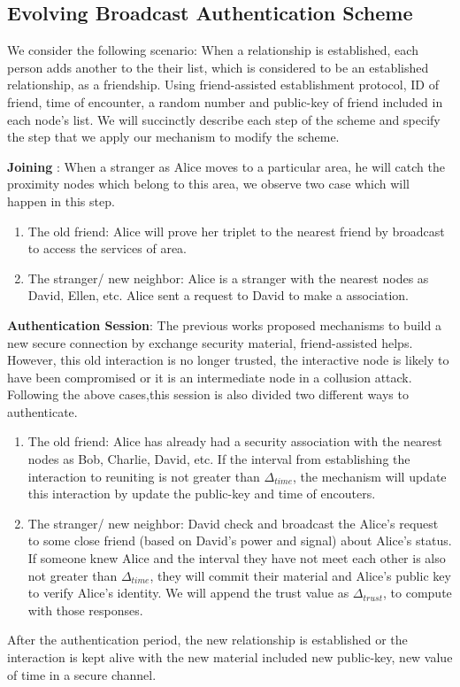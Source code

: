 \documentclass[sigconf]{acmart}
\begin{document}
\subsection{Evolving Broadcast Authentication Scheme}
We consider the following scenario: When a relationship is established, each person adds another to the their list, which is considered to be an established relationship, as a friendship. Using friend-assisted establishment protocol, ID of friend, time of encounter, a random number and public-key of friend included in each node's list. We will succinctly describe each step of the scheme and specify the step that we apply our mechanism to modify the scheme.\par
\textbf{Joining	}: When a stranger as Alice moves to a particular area, he will catch the proximity nodes which belong to this area, we observe two case which will happen in this step. 
    \begin{enumerate}
		\item The old friend: Alice will prove her triplet to the nearest friend by broadcast to access the services of area.
		\item The stranger/ new neighbor: Alice is a stranger with the nearest nodes as David, Ellen, etc. Alice sent a request to David to make a association.
	\end{enumerate} \par
\textbf{Authentication Session}: The previous works proposed mechanisms to build a new secure connection by exchange security material, friend-assisted helps. However, this old interaction is no longer trusted, the interactive node is likely to have been compromised or it is an intermediate node in a collusion attack. Following the above cases,this session is also divided two different ways to authenticate.\par
	\begin{enumerate}
		\item The old friend: Alice has already had a security association with the nearest nodes as Bob, Charlie, David, etc. If the interval from establishing the interaction to reuniting is not greater than $\Delta_{time}$, the mechanism will update this interaction by update the public-key and time of encouters.
		\item The stranger/ new neighbor: David check and broadcast the Alice's request to some close friend (based on David's power and signal) about Alice's status. If someone knew Alice and the interval they have not meet each other is also not greater than $\Delta_{time}$, they will commit their material and Alice's public key to verify Alice's identity. We will append the trust value as $\Delta_{trust}$, to compute with those responses. 
	\end{enumerate} \par
After the authentication period, the new relationship is established or the interaction is kept alive with the new material included new public-key, new value of time in a secure channel. 
\end{document}
